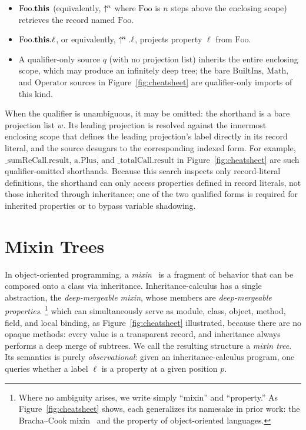 \begin{itemize}
  \item $\mathrm{Foo}.\mathbf{this}$ (equivalently, $\uparrow^{\!n}$ where
    $\mathrm{Foo}$ is $n$ steps above the enclosing scope)
    retrieves the record named $\mathrm{Foo}$.
  \item $\mathrm{Foo}.\mathbf{this}.\ell$, or equivalently, $\uparrow^{\!n}.\ell$,
    projects property $\ell$ from $\mathrm{Foo}$.
  \item A qualifier-only source $q$ (with no projection list) inherits
    the entire enclosing scope, which may produce an infinitely deep
    tree; the bare $\mathrm{BuiltIns}$, $\mathrm{Math}$, and
    $\mathrm{Operator}$ sources in Figure~\ref{fig:cheatsheet} are
    qualifier-only imports of this kind.
\end{itemize}

When the qualifier is unambiguous, it may be omitted: the shorthand is
a bare projection list $w$. Its leading projection is resolved against
the innermost enclosing scope that defines the leading projection's
label directly in its record literal, and the source desugars to the
corresponding indexed form.
For example, $\mathrm{\_sumReCall}.\mathrm{result}$,
$\mathrm{a}.\mathrm{Plus}$, and $\mathrm{\_totalCall}.\mathrm{result}$
in Figure~\ref{fig:cheatsheet} are such qualifier-omitted shorthands.
Because this search inspects only record-literal definitions, the
shorthand can only access properties defined in record literals, not
those inherited through inheritance; one of the two qualified forms is
required for inherited properties or to bypass variable shadowing.

\section{Mixin Trees}
\label{sec:mixin-trees}

In object-oriented programming, a
\emph{mixin}~\cite{bracha1990-mixin-inheritance} is a fragment of behavior
that can be composed onto a class via inheritance.
Inheritance-calculus has a single abstraction, the
\emph{deep-mergeable mixin}, whose members are
\emph{deep-mergeable properties}.%
\footnote{
  Where no ambiguity arises, we write simply ``mixin'' and ``property.''
  As Figure~\ref{fig:cheatsheet} shows, each generalizes its namesake in prior
  work: the Bracha--Cook mixin~\cite{bracha1990-mixin-inheritance} and the
  property of object-oriented languages.
}
which can simultaneously serve as module, class, object, method, field, and
local binding, as Figure~\ref{fig:cheatsheet} illustrated, because there
are no opaque methods: every value is
a transparent record, and inheritance always performs a deep
merge of subtrees.
We call the resulting structure a \emph{mixin tree}.
Its semantics is purely \emph{observational}: given an
inheritance-calculus program, one queries whether a
label $\ell$ is a property at a given position $p$.

